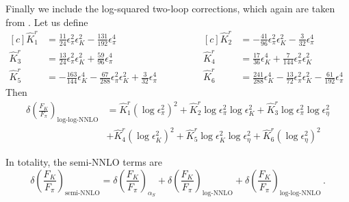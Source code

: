 \documentclass[prd,tightenlines,preprintnumbers,showpacs,superscriptaddress,notitlepage,eqsecnum,floatfix,notitlepage]{revtex4-1}
\begin{document}
Finally we include the log-squared two-loop corrections, which again are taken from \cite{Ananthanarayan:2017qmx}.  Let us define 
\begin{equation}
\begin{aligned}[c]
\hat K^r_1  &=  \frac{11}{24} \epsilon_\pi^2 \epsilon_K^2 - \frac{131}{192} \epsilon_\pi^4 \\
\hat K^r_3 & = \frac{13}{24} \epsilon_\pi^2 \epsilon_K^2 + \frac{59}{96} \epsilon_\pi^4 \qquad \\
\hat K^r_5  &= -\frac{163}{144}  \epsilon_K^4 - \frac{67}{288} \epsilon_\pi^2 \epsilon_K^2 + \frac{3}{32} \epsilon_\pi^4 \qquad
\end{aligned}
\qquad
\begin{aligned}[c]
\hat K^r_2 &= -\frac{41}{96} \epsilon_\pi^2 \epsilon_K^2 - \frac{3}{32} \epsilon_\pi^4  \\
\hat K^r_4 &= \frac{17}{36} \epsilon_K^4 + \frac{7}{144} \epsilon_\pi^2 \epsilon_K^2 \\
\hat K^r_6 &= \frac{241}{288}  \epsilon_K^4 - \frac{13}{72} \epsilon_\pi^2 \epsilon_K^2 - \frac{61}{192}  \epsilon_\pi^4 \qquad
\end{aligned}
\end{equation}
Then
\begin{align}
\delta\left(\frac{F_K}{F_\pi}\right)_\text{log-log-NNLO} &=
 \hat K^r_1 \left( \log \epsilon_\pi^2 \right)^2
 + \hat K^r_2 \log \epsilon_\pi^2  \log \epsilon_K^2
 + \hat K^r_3 \log \epsilon_\pi^2 \log \epsilon_\eta^2 \\
 &+\hat K^r_4 \left( \log \epsilon_K^2 \right)^2
 +\hat K^r_5 \log \epsilon_K^2  \log \epsilon_\eta^2
  +\hat K^r_6 \left( \log \epsilon_\eta^2 \right)^2 \nonumber
\end{align}

In totality, the semi-NNLO terms are
\begin{equation}
\delta\left(\frac{F_K}{F_\pi}\right)_{\text{semi-NNLO}} =
\delta\left(\frac{F_K}{F_\pi}\right)_{\alpha_S}
+ \delta\left(\frac{F_K}{F_\pi}\right)_{\text{log-NNLO}}
+ \delta\left(\frac{F_K}{F_\pi}\right)_{\text{log-log-NNLO}}\, .
\end{equation}
\end{document}
